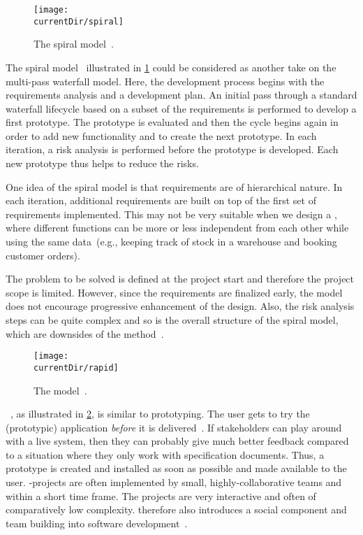 \begin{figure}%
\centering%
\texttt{[image: \\currentDir/spiral]}%
\caption{The spiral model~\cite{B1985ASMOSDAE,B1988ASMOSDAE,S2007OOSE,GMTM2011DDLC}.}%
\label{fig:model:spiral}%
\end{figure}%

The spiral model~\cite{B1985ASMOSDAE,B1988ASMOSDAE,PA2009SETAP,GMTM2011DDLC} illustrated in \cref{fig:model:spiral} could be considered as another take on the multi-pass waterfall model.
Here, the development process begins with the requirements analysis and a development plan.
An initial pass through a standard waterfall lifecycle based on a subset of the requirements is performed to develop a first prototype.
The prototype is evaluated and then the cycle begins again in order to add new functionality and to create the next prototype.
In each iteration, a risk analysis is performed before the prototype is developed.
Each new prototype thus helps to reduce the risks.

One idea of the spiral model is that requirements are of hierarchical nature.
In each iteration, additional requirements are built on top of the first set of requirements implemented.
This may not be very suitable when we design a \db, where different functions can be more or less independent from each other while using the same data~(e.g., keeping track of stock in a warehouse and booking customer orders).

The problem to be solved is defined at the project start and therefore the project scope is limited.
However, since the requirements are finalized early, the model does not encourage progressive enhancement of the design.
Also, the risk analysis steps can be quite complex and so is the overall structure of the spiral model, which are downsides of the method~\cite{S2007OOSE,GMTM2011DDLC}.

\begin{figure}%
\centering%
\texttt{[image: \\currentDir/rapid]}%
\caption{The  model~\cite{M1991RAD,S2007OOSE,GMTM2011DDLC,I2018SAH,N2024SEFDS}.}%
\label{fig:model:rad}%
\end{figure}%
%
~\cite{BDCMT1999RADRAER,M1991RAD}, as illustrated in \cref{fig:model:rad}, is similar to prototyping.
The user gets to try the (prototypic) application \emph{before} it is delivered~\cite{S2007OOSE,GMTM2011DDLC,M1996RTWSS}.
If stakeholders can play around with a live system, then they can probably give much better feedback compared to a situation where they only work with specification documents.
Thus, a prototype is created and installed as soon as possible and made available to the user.
-projects are often implemented by small, highly-collaborative teams and within a short time frame.
The projects are very interactive and often of comparatively low complexity.
 therefore also introduces a social component and team building into software development~\cite{BDCMT1999RADRAER}.


